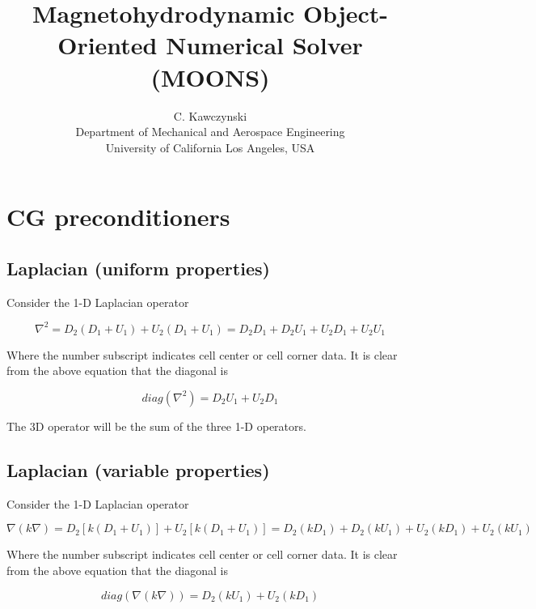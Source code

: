 \documentclass[11pt]{article}
\begin{document}
\doublespacing
\title{Magnetohydrodynamic Object-Oriented Numerical Solver (MOONS)}
\author{C. Kawczynski \\
Department of Mechanical and Aerospace Engineering \\
University of California Los Angeles, USA\\
}

\section{CG preconditioners}

\subsection{Laplacian (uniform properties)}
Consider the 1-D Laplacian operator

\begin{equation}
  \nabla^2 = D_2(D_1 + U_1) + U_2(D_1 + U_1)
  = D_2D_1 + D_2U_1 + U_2D_1 + U_2U_1
\end{equation}

Where the number subscript indicates cell center or cell corner data. It is clear from the above equation that the diagonal is

\begin{equation}
  diag(\nabla^2) = D_2U_1 + U_2D_1
\end{equation}

The 3D operator will be the sum of the three 1-D operators.

\subsection{Laplacian (variable properties)}
Consider the 1-D Laplacian operator

\begin{equation}
  \nabla (k\nabla) = D_2 [k(D_1 + U_1)] + U_2 [k(D_1 + U_1)]
  = D_2(kD_1) + D_2(kU_1) + U_2(kD_1) + U_2(kU_1)
\end{equation}

Where the number subscript indicates cell center or cell corner data. It is clear from the above equation that the diagonal is

\begin{equation}
  diag(\nabla (k\nabla)) = D_2(kU_1) + U_2(kD_1)
\end{equation}
\end{document}
